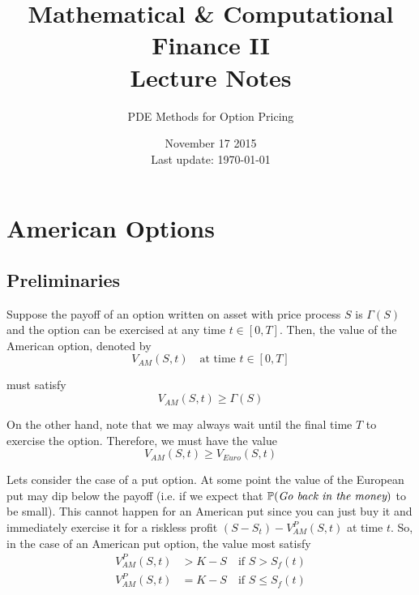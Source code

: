 \documentclass[12pt]{article}
\newlength\tindent
\renewcommand{\indent}{\hspace*{\tindent}}
\renewcommand{\P}{\mathbb P}
\begin{document}
 
 
\title{Mathematical \& Computational Finance II\\Lecture Notes}
\author{PDE Methods for Option Pricing}
\date{November 17 2015 \\ Last update: \today{}}
\maketitle

\section{American Options}

\subsection{Preliminaries}

\indent Suppose the payoff of an option written on asset with price process $S$ is $\Gamma(S)$ and the option can be exercised at any time $t \in [0, T]$. Then, the value of the American option, denoted by
\begin{equation*}
	V_{AM}(S, t) \quad \text{at time } t \in [0, T]
\end{equation*}

must satisfy 
\begin{equation*}
	V_{AM}(S, t) \geq \Gamma(S)
\end{equation*}

\indent On the other hand, note that we may always wait until the final time $T$ to exercise the option. Therefore, we must have the value
\begin{equation*}
	V_{AM}(S, t) \geq V_{Euro}(S, t)
\end{equation*}

\indent Lets consider the case of a put option. At some point the value of the European put may dip below the payoff (i.e. if we expect that $\P(\text{\em Go back in the money})$ to be small). This cannot happen for an American put since you can just buy it and immediately exercise it for a riskless profit $(S - S_t) - V^P_{AM}(S, t)$ at time $t$. So, in the case of an American put option, the value most satisfy
\begin{align*}
	V^P_{AM}(S, t) &> K - S \quad \text{if } S > S_f(t) \\
	V^P_{AM}(S, t) &= K - S \quad \text{if } S \leq S_f(t)
\end{align*}
\end{document}
